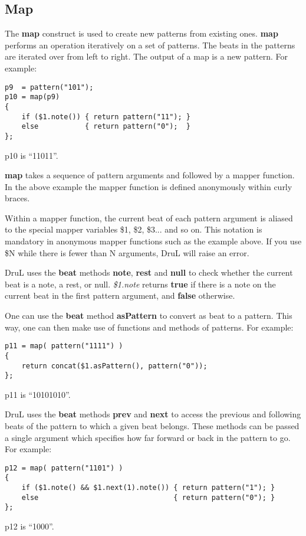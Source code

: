 \subsection{Map}\label{MapSection}

The \textbf{map} construct is used to create new patterns from existing ones.
\textbf{map} performs an operation iteratively on a set of patterns.
The beats in the patterns are iterated over from left to right.
The output of a map is a new pattern.  For example:
\begin{verbatim}
p9  = pattern("101");
p10 = map(p9)
{
    if ($1.note()) { return pattern("11"); }
    else           { return pattern("0");  }
};
\end{verbatim}
p10 is ``11011''.

\textbf{map} takes a sequence of pattern arguments and followed by a mapper function.  In the above example the mapper function is defined anonymously within curly braces.

Within a mapper function, the current beat of each pattern argument is aliased to the special mapper variables \$1, \$2, \$3... and so on.  This notation is mandatory in anonymous mapper functions such as the example above. If you use \$N while there is fewer than N arguments, DruL will raise an error.

DruL uses the \textbf{beat} methods \textbf{note}, \textbf{rest} and \textbf{null} to check whether
the current beat is a note, a rest, or null.
\textit{\$1.note} returns \textbf{true} if there is a note on the current beat in the first pattern argument, and \textbf{false} otherwise.

One can use the \textbf{beat} method \textbf{asPattern} to convert as beat to a pattern.  This way, one can then make use
of functions and methods of patterns.  For example:
\begin{verbatim}
p11 = map( pattern("1111") )
{
    return concat($1.asPattern(), pattern("0"));
};
\end{verbatim}
p11 is ``10101010''.

DruL uses the \textbf{beat} methods \textbf{prev} and \textbf{next} to access the previous and following beats of the pattern to which a given beat belongs.  These methods can be passed a single argument which specifies how far forward or back in the pattern to go.  For example:
\begin{verbatim}
p12 = map( pattern("1101") )
{
    if ($1.note() && $1.next(1).note()) { return pattern("1"); }
    else                                { return pattern("0"); }
};
\end{verbatim}
p12 is ``1000''.

